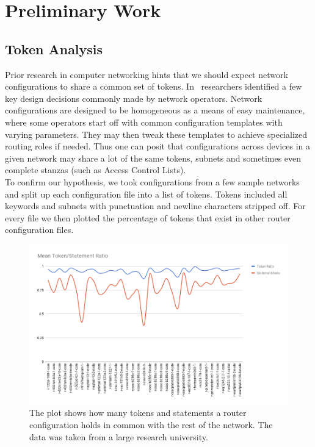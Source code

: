 \section{Preliminary Work}

\subsection{Token Analysis}
Prior research in computer networking hints that we should expect network configurations to share a common set of tokens. In~\cite{complexity} researchers identified a few key design decisions commonly made by network operators. Network configurations are designed to be homogeneous as a means of easy maintenance, where some operators start off with common configuration templates with varying parameters. They may then tweak these templates to achieve specialized routing roles if needed. Thus one can posit that configurations across devices in a given network may share a lot of the same tokens, subnets and sometimes even complete stanzas (such as Access Control Lists).\\ 

To confirm our hypothesis, we took configurations from a few sample networks and split up each configuration file into a list of tokens. Tokens included all keywords and subnets with punctuation and newline characters stripped off. For every file we then plotted the percentage of tokens that exist in other router configuration files.

\begin{figure}[H]
	\centering
	\includegraphics[width=\textwidth]{chart.png}
	\caption{The plot shows how many tokens and statements a router configuration holds in common with the rest of the network. The data was taken from a large research university.}
\end{figure}

